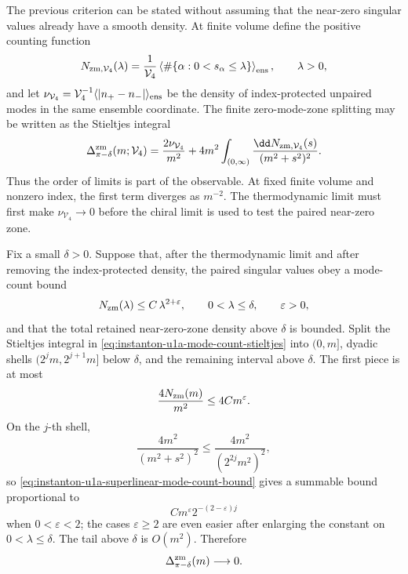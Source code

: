 \begin{controlledapproximation}
\label{ca:instanton-u1a-mode-count-restoration}
The previous criterion can be stated without assuming that the near-zero
singular values already have a smooth density.  At finite volume define the
positive counting function
\begin{equation}
  N_{\rm zm,\mathcal V_4}(\lambda)
  =
  \frac1{\mathcal V_4}
  \left\langle
    \#\{\alpha:0<s_\alpha\le\lambda\}
  \right\rangle_{\rm ens},
  \qquad \lambda>0,
  \label{eq:instanton-u1a-mode-counting-function}
\end{equation}
and let
\(\nu_{\mathcal V_4}=\mathcal V_4^{-1}\langle |n_+-n_-|\rangle_{\rm ens}\)
be the density of index-protected unpaired modes in the same ensemble
coordinate.  The finite zero-mode-zone splitting may be written as the
Stieltjes integral
\begin{equation}
  \Delta_{\pi-\delta}^{\rm zm}(m;\mathcal V_4)
  =
  \frac{2\nu_{\mathcal V_4}}{m^2}
  +
  4m^2\int_{(0,\infty)}
  \frac{\dd N_{\rm zm,\mathcal V_4}(s)}{(m^2+s^2)^2}.
  \label{eq:instanton-u1a-mode-count-stieltjes}
\end{equation}
Thus the order of limits is part of the observable.  At fixed finite volume
and nonzero index, the first term diverges as \(m^{-2}\).  The thermodynamic
limit must first make \(\nu_{\mathcal V_4}\to0\) before the chiral limit is
used to test the paired near-zero zone.

Fix a small \(\delta>0\).  Suppose that, after the thermodynamic limit and
after removing the index-protected density, the paired singular values obey a
mode-count bound
\begin{equation}
  N_{\rm zm}(\lambda)
  \le
  C\,\lambda^{2+\varepsilon},
  \qquad 0<\lambda\le\delta,
  \qquad \varepsilon>0,
  \label{eq:instanton-u1a-superlinear-mode-count-bound}
\end{equation}
and that the total retained near-zero-zone density above \(\delta\) is
bounded.  Split the Stieltjes integral in
\eqref{eq:instanton-u1a-mode-count-stieltjes} into
\((0,m]\), dyadic shells \((2^jm,2^{j+1}m]\) below \(\delta\), and the
remaining interval above \(\delta\).  The first piece is at most
\[
  \frac{4N_{\rm zm}(m)}{m^2}
  \le 4C m^\varepsilon .
\]
On the \(j\)-th shell,
\[
  \frac{4m^2}{(m^2+s^2)^2}
  \le
  \frac{4m^2}{(2^{2j}m^2)^2},
\]
so \eqref{eq:instanton-u1a-superlinear-mode-count-bound} gives a summable
bound proportional to
\[
  C m^\varepsilon 2^{-(2-\varepsilon)j}
\]
when \(0<\varepsilon<2\); the cases \(\varepsilon\ge2\) are even easier after
enlarging the constant on \(0<\lambda\le\delta\).  The tail above \(\delta\)
is \(O(m^2)\).  Therefore
\begin{equation}
  \Delta_{\pi-\delta}^{\rm zm}(m)\longrightarrow0 .
  \label{eq:instanton-u1a-mode-count-vanishing}
\end{equation}


\end{controlledapproximation}
